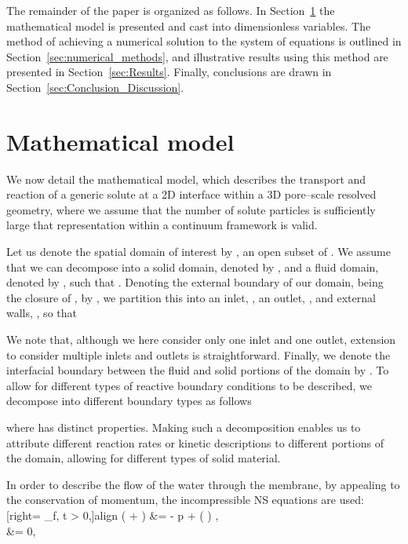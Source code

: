 \documentclass[preprint, 1p, authoryear]{elsarticle}
\begin{document}
The remainder of the paper is organized as follows. In Section~\ref{sec:Mathematical_Model} the 
mathematical model is presented and cast into dimensionless variables. The method of achieving a 
numerical solution to the system of equations is outlined in Section~\ref{sec:numerical_methods}, and 
illustrative results using this method are presented in Section~\ref{sec:Results}.  Finally, conclusions are drawn in 
Section~\ref{sec:Conclusion_Discussion}.

\section{Mathematical model}
\label{sec:Mathematical_Model}
We now detail  the mathematical model, which describes the transport and reaction of a generic solute at a 2D interface within a 3D pore--scale resolved geometry, where we assume that the number of solute particles is sufficiently large  that representation within a continuum framework is valid. 



Let us denote the spatial domain of interest by , an open subset of . We assume that we can decompose  into a solid domain, denoted by , and a fluid domain, denoted by , such that   . Denoting the  external boundary of our domain, being the closure of , by , we partition this into an inlet, , an outlet, ,  and  external walls, ,  so that

We note that, although we here consider only one inlet and one outlet, extension to consider multiple inlets and outlets 
 is straightforward. Finally, we denote the interfacial boundary between the fluid and solid portions of the domain by . To allow for different types of reactive boundary conditions to be described, we decompose  into   different boundary types as follows

where  has distinct properties. Making such a decomposition enables us to attribute different reaction rates or kinetic descriptions to different portions of the domain, allowing for different types of solid material. 

In order to describe the flow of the water through the membrane, by appealing to the conservation of momentum,  the incompressible NS equations are used:
[right={\qquad {} \in \Omega_f, \: t > 0,}]{align}
\rho \left( \displaystyle{} +  \cdot \nabla {} \right) &= - \nabla p + \mu\nabla \cdot \left( \nabla {}\right) ,\label{eq:Navier_Stokes_equations_eq1} \\
\nabla \cdot {} &= 0, \label{eq:Navier_Stokes_equations_eq2}
\end{document}
